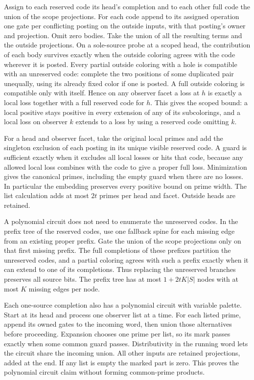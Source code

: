 Assign to each reserved code its head's completion
and to each other full code the union of the scope
projections. For each code append to its assigned
operation one gate per conflicting posting on the
outside inputs, with that posting's owner and
projection. Omit zero bodies. Take the union of
all the resulting terms and the outside projections.
On a sole-source probe at a scoped head, the
contribution of each body survives exactly when
the outside coloring agrees with the code wherever
it is posted. Every partial outside coloring with
a hole is compatible with an unreserved code:
complete the two positions of some duplicated
pair unequally, using its already fixed color if
one is posted. A full outside coloring is
compatible only with itself. Hence on any
observer facet a loss at $h$ is exactly a local
loss together with a full reserved code for $h$.
This gives the scoped bound: a local positive
stays positive in every extension of any of its
subcolorings, and a local loss on observer $k$
extends to a loss by using a reserved code
omitting $k$.

For a head and observer facet, take the original
local primes and add the singleton exclusion of
each posting in its unique visible reserved code.
A guard is sufficient exactly when it excludes
all local losses or hits that code, because any
allowed local loss combines with the code to give
a proper full loss. Minimization gives the
canonical primes, including the empty guard
when there are no losses. In particular the
embedding preserves every positive bound on
prime width. The list calculation adds at most
$2t$ primes per head and facet. Outside heads
are retained.

A polynomial circuit does not need to enumerate
the unreserved codes. In the prefix tree of the
reserved codes, use one fallback spine for each
missing edge from an existing proper prefix.
Gate the union of the scope projections only
on that first missing prefix. The full
completions of these prefixes partition the
unreserved codes, and a partial coloring agrees
with such a prefix exactly when it can extend
to one of its completions. Thus replacing the
unreserved branches preserves all source bits.
The prefix tree has at most $1+2tK|S|$ nodes
with at most $K$ missing edges per node.

Each one-source completion also has a
polynomial circuit with variable palette.
Start at its head and process one observer list
at a time. For each listed prime, append its
owned gates to the incoming word, then union
those alternatives before proceeding. Expansion
chooses one prime per list, so its mark passes
exactly when some common guard passes.
Distributivity in the running word lets the
circuit share the incoming union. All other
inputs are retained projections, added at the
end. If any list is empty the marked part is
zero. This proves the polynomial circuit claim
without forming common-prime products.

